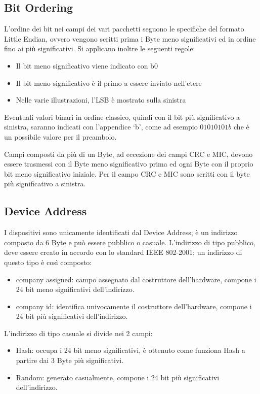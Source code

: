 \subsection{Bit Ordering}
L'ordine dei bit nei campi dei vari pacchetti seguono le specifiche del formato Little Endian, ovvero vengono scritti prima i Byte meno significativi ed in ordine fino ai più significativi. Si applicano inoltre le seguenti regole:

\begin{itemize}
\item Il bit meno significativo viene indicato con b0
\item Il bit meno significativo è il primo a essere inviato nell'etere
\item Nelle varie illustrazioni, l'LSB è mostrato sulla sinistra
\end{itemize}

Eventuali valori binari in ordine classico, quindi con il bit più significativo a sinistra, saranno indicati con l'appendice \lq b\rq, come ad esempio $01010101b$ che è un possibile valore per il preambolo.

Campi composti da più di un Byte, ad eccezione dei campi CRC e MIC, devono essere trasmessi con il Byte meno significativo prima ed ogni Byte con il proprio bit meno significativo iniziale.
Per il campo CRC e MIC sono scritti con il byte più significativo a sinistra.

\subsection{Device Address}
I dispositivi sono unicamente identificati dal Device Address; è un indirizzo composto da 6 Byte e può essere pubblico o casuale.
L'indirizzo di tipo pubblico, deve essere creato in accordo con lo standard IEEE 802-2001; un indirizzo di questo tipo è così composto:
\begin{itemize}
\item company assigned: campo assegnato dal costruttore dell'hardware, compone i 24 bit meno significativi dell'indirizzo.
\item company id: identifica univocamente il costruttore dell'hardware, compone i 24 bit più significativi dell'indirizzo.
\end{itemize}
L'indirizzo di tipo casuale si divide nei 2 campi:
\begin{itemize}
\item Hash: occupa i 24 bit meno significativi, è ottenuto come funziona Hash a partire dai 3 Byte più significativi.
\item Random: generato casualmente, compone i 24 bit più significativi dell'indirizzo.
\end{itemize}



